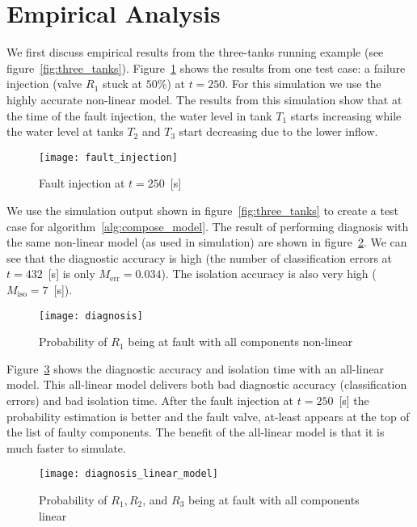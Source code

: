 \section{Empirical Analysis}
%
We first discuss empirical results from the three-tanks running
example (see
figure~\ref{fig:three_tanks}). Figure~\ref{fig:fault_injection} shows
the results from one test case: a failure injection (valve $R_1$ stuck
at $50$\%) at $t = 250$. For this simulation we use the highly accurate
non-linear model. The results from this simulation show that at the
time of the fault injection, the water level in tank $T_1$ starts
increasing while the water level at tanks $T_2$ and $T_3$ start
decreasing due to the lower inflow.
%
\begin{figure}[htb]
  \centering
  \texttt{[image: fault\_injection]}
  \caption{Fault injection at $t = 250$~[s]}
  \label{fig:fault_injection}
\end{figure}
\par
%
We use the simulation output shown in figure~\ref{fig:three_tanks} to
create a test case for algorithm~\ref{alg:compose_model}. The result
of performing diagnosis with the same non-linear model (as used in
simulation) are shown in figure~\ref{fig:diagnosis1}. We can see that
the diagnostic accuracy is high (the number of classification errors
at $t = 432$~[s] is only $M_{\mathrm{err}} = 0.034$). The isolation
accuracy is also very high ($M_{\mathrm{iso}} = 7$~[s]).
%
\begin{figure}[htb]
  \centering
  \texttt{[image: diagnosis]}
  \caption{Probability of $R_1$ being at fault with all components non-linear}
  \label{fig:diagnosis1}
\end{figure}
\par
%
Figure~\ref{fig:diagnosis_linear_model} shows the diagnostic accuracy
and isolation time with an all-linear model. This all-linear model
delivers both bad diagnostic accuracy (classification errors) and bad
isolation time. After the fault injection at $t = 250$~[s] the
probability estimation is better and the fault valve, at-least appears
at the top of the list of faulty components. The benefit of the
all-linear model is that it is much faster to simulate.
%
\begin{figure}[htb]
  \centering
  \texttt{[image: diagnosis\_linear\_model]}
  \caption{Probability of $R_1, R_2$, and $R_3$ being at fault with all components linear}
  \label{fig:diagnosis_linear_model}
\end{figure}
\par

